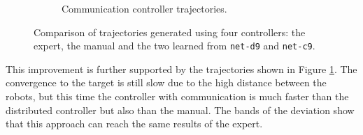 \begin{figure}[!htb]
\begin{center}
\begin{subfigure}[h]{0.49\textwidth}
			\caption{Communication controller trajectories.}
		\end{subfigure}
	\end{center}
	\vspace{-0.5cm}
	\caption[Evaluation of the trajectories learned by \texttt{net-c9}.]{Comparison 
	of trajectories generated using four controllers: the expert, the manual and the 
	two learned from \texttt{net-d9} and \texttt{net-c9}.}
	\label{fig:net-c9traj}
\end{figure}
This improvement is further supported by the trajectories shown in Figure 
\ref{fig:net-c9traj}. 
The convergence to the target is still slow due to the high distance between the 
robots, but this time the controller with communication is much faster than the 
distributed controller but also than the manual. The bands of the deviation show 
that this approach can reach the same results of the expert.

